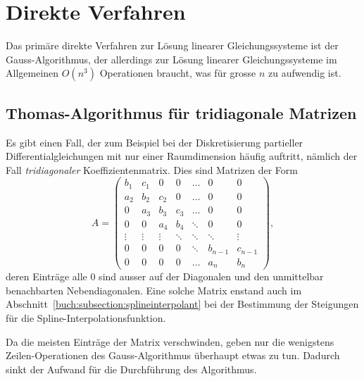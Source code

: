 %
%
%
\section{Direkte Verfahren
\label{buch:section:direkt}}
Das primäre direkte Verfahren zur Lösung linearer Gleichungssysteme ist
der Gauss-Algorithmus, der allerdings
zur Lösung linearer Gleichungssysteme im Allgemeinen $O(n^3)$
Operationen braucht, was für grosse $n$ zu aufwendig ist.

%
%

\subsection{Thomas-Algorithmus für tridiagonale Matrizen
\label{buch:subsection:thomasalgorithmus}}
Es gibt einen Fall, der zum Beispiel bei der Diskretisierung
partieller Differentialgleichungen mit nur einer Raumdimension
häufig auftritt, nämlich der Fall {\em tridiagonaler} Koeffizientenmatrix.
Dies sind Matrizen der Form
\begin{equation}
A
=
\begin{pmatrix}
b_1   & c_1   &  0    &  0    &\dots  &  0    &  0     \\
a_2   & b_2   & c_2   &  0    &\dots  &  0    &  0     \\
 0    & a_3   & b_3   & c_3   &\dots  &  0    &  0     \\
 0    &  0    & a_4   & b_4   &\ddots &  0    &  0     \\
\vdots&\vdots &\vdots &\ddots &\ddots &\ddots &\vdots  \\
 0    &  0    &  0    &  0    &\ddots &b_{n-1}&c_{n-1} \\
 0    &  0    &  0    &  0    &\dots  &a_{n}  &b_n
\end{pmatrix},
\end{equation}
deren Einträge alle $0$ sind ausser auf der Diagonalen und den unmittelbar
benachbarten Nebendiagonalen.
Eine solche Matrix enstand auch im
Abschnitt~\ref{buch:subsection:splineinterpolant}
bei der Bestimmung der Steigungen für die Spline-Interpolationsfunktion.

Da die meisten Einträge der Matrix verschwinden, geben nur die wenigstens
Zeilen-Operationen des Gauss-Algorithmus überhaupt etwas zu tun.
Dadurch sinkt der Aufwand für die Durchführung des Algorithmus.

